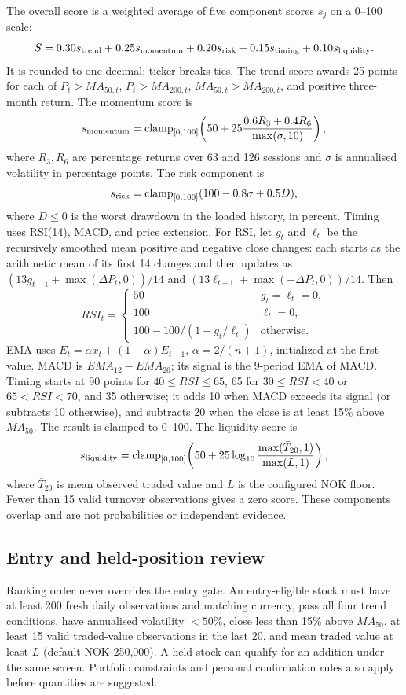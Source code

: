 \documentclass[11pt]{article}
\begin{document}
The overall score is a weighted average of five component scores $s_j$ on a
0--100 scale:
\[
 S=0.30s_{\rm trend}+0.25s_{\rm momentum}+0.20s_{\rm risk}
   +0.15s_{\rm timing}+0.10s_{\rm liquidity}.
\]
It is rounded to one decimal; ticker breaks ties. The trend score awards 25
points for each of $P_t>MA_{50,t}$, $P_t>MA_{200,t}$,
$MA_{50,t}>MA_{200,t}$, and positive three-month return. The momentum score is
\[
s_{\rm momentum}=\operatorname{clamp}_{[0,100]}\!\left(
50+25\frac{0.6R_3+0.4R_6}{\max(\sigma,10)}\right),
\]
where $R_3,R_6$ are percentage returns over 63 and 126 sessions and $\sigma$
is annualised volatility in percentage points. The risk component is
\[
s_{\rm risk}=\operatorname{clamp}_{[0,100]}(100-0.8\sigma+0.5D),
\]
where $D\leq0$ is the worst drawdown in the loaded history, in percent. Timing
uses RSI(14), MACD, and price extension. For RSI, let $g_t$ and $\ell_t$ be
the recursively smoothed mean positive and negative close changes: each starts
as the arithmetic mean of its first 14 changes and then updates as
$(13g_{t-1}+\max(\Delta P_t,0))/14$ and
$(13\ell_{t-1}+\max(-\Delta P_t,0))/14$. Then
\[
RSI_t=\begin{cases}50&g_t=\ell_t=0,\\100&\ell_t=0,\\
100-100/(1+g_t/\ell_t)&\text{otherwise.}\end{cases}
\]
EMA uses $E_t=\alpha x_t+(1-\alpha)E_{t-1}$,
$\alpha=2/(n+1)$, initialized at the first value. MACD is
$EMA_{12}-EMA_{26}$; its signal is the 9-period EMA of MACD. Timing starts at
90 points for $40\leq RSI\leq65$, 65 for $30\leq RSI<40$ or
$65<RSI<70$, and 35 otherwise; it adds 10 when MACD exceeds its signal (or
subtracts 10 otherwise), and subtracts 20 when the close is at least 15\% above
$MA_{50}$. The result is clamped to 0--100. The liquidity score is
\[
s_{\rm liquidity}=\operatorname{clamp}_{[0,100]}\!\left(
50+25\log_{10}\frac{\max(\bar T_{20},1)}{\max(L,1)}\right),
\]
where $\bar T_{20}$ is mean observed traded value and $L$ is the configured
NOK floor. Fewer than 15 valid turnover observations gives a zero score.
These components overlap and are not probabilities or independent evidence.

\subsection{Entry and held-position review}

Ranking order never overrides the entry gate. An entry-eligible stock must
have at least 200 fresh daily observations and matching currency, pass all
four trend conditions, have annualised volatility $<50\%$, close less than
15\% above $MA_{50}$, at least 15 valid traded-value observations in the last
20, and mean traded value at least $L$ (default NOK 250{,}000). A held stock
can qualify for an addition under the same screen. Portfolio constraints and
personal confirmation rules also apply before quantities are suggested.
\end{document}

